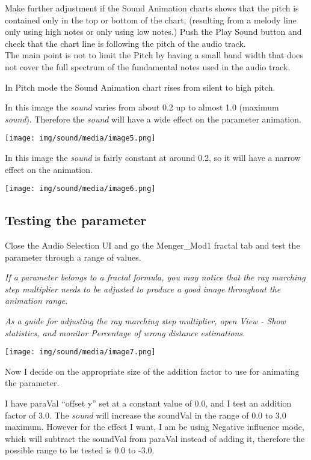 Make further adjustment if the Sound Animation charts shows that the
pitch is contained only in the top or bottom of the chart, (resulting
from a melody line only using high notes or only using low notes.) Push
the Play Sound button and check that the chart line is following the
pitch of the audio track.\\
The main point is not to limit the Pitch by having a small band width
that does not cover the full spectrum of the fundamental notes used in
the audio track.

In Pitch mode the Sound Animation chart rises from silent to high pitch.

In this image the \emph{sound} varies from about 0.2 up to almost 1.0
(maximum \emph{sound}). Therefore the \emph{sound} will have a wide
effect on the parameter animation.

\texttt{[image: img/sound/media/image5.png]}

In this image the \emph{sound} is fairly constant at around 0.2, so it
will have a narrow effect on the animation.

\texttt{[image: img/sound/media/image6.png]}

\subsection{Testing the parameter}\label{testing-the-parameter}

Close the Audio Selection UI and go the Menger\_Mod1 fractal tab and
test the parameter through a range of values.

\emph{If a parameter belongs to a fractal formula, you may notice that
the ray marching step multiplier needs to be adjusted to produce a good
image throughout the animation range.}

\emph{As a guide for adjusting the ray marching step multiplier, open
View - Show statistics, and monitor Percentage of wrong distance
estimations.}

\texttt{[image: img/sound/media/image7.png]}

Now I decide on the appropriate size of the addition factor to use for
animating the parameter.

I have paraVal ``offset y'' set at a constant value of 0.0, and I test
an addition factor of 3.0. The \emph{sound} will increase the soundVal
in the range of 0.0 to 3.0 maximum. However for the effect I want, I am
be using Negative influence mode, which will subtract the soundVal from
paraVal instead of adding it, therefore the possible range to be tested
is 0.0 to -3.0.

